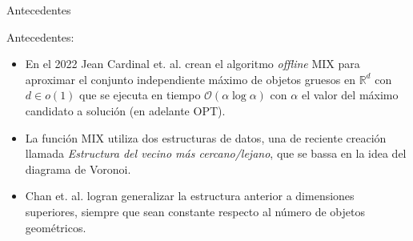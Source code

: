 \begin{frame}{Antecedentes}
  
  Antecedentes:
  
  \begin{itemize}[<+->]
  \item En el 2022 Jean Cardinal et. al. crean el algoritmo \textit{offline} MIX para aproximar
    el conjunto independiente máximo de objetos gruesos en $\mathbb{R}^d$ con
    $d \in o(1)$ que se ejecuta en tiempo $\mathcal{O}(\alpha \log \alpha)$ con
    $\alpha$ el valor del máximo candidato a solución (en adelante OPT).
  \item La función MIX utiliza dos estructuras de datos, una de reciente creación
    llamada \textit{Estructura del vecino más cercano/lejano}, que se bassa en la
    idea del diagrama de Voronoi.
  \item Chan et. al. logran generalizar la estructura anterior a dimensiones superiores, siempre
    que sean constante respecto al número de objetos geométricos.
  \end{itemize}
\end{frame}
